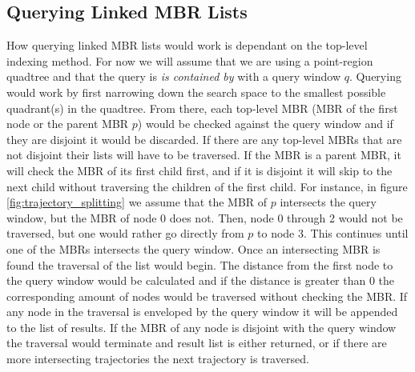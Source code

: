 \subsection{Querying Linked MBR Lists} 
How querying linked MBR lists would work is dependant on the top-level indexing method. For now we will assume that we are using a point-region quadtree and that the query is \textit{is contained by} with a query window $q$. Querying would work by first narrowing down the search space to the smallest possible quadrant(s) in the quadtree. From there, each top-level MBR (MBR of the first node or the parent MBR $p$) would be checked against the query window and if they are disjoint it would be discarded. If there are any top-level MBRs that are not disjoint their lists will have to be traversed. If the MBR is a parent MBR, it will check the MBR of its first child first, and if it is disjoint it will skip to the next child without traversing the children of the first child. For instance, in figure \ref{fig:trajectory_splitting} we assume that the MBR of $p$ intersects the query window, but the MBR of node 0 does not. Then, node 0 through 2 would not be traversed, but one would rather go directly from $p$ to node 3. This continues until one of the MBRs intersects the query window. Once an intersecting MBR is found the traversal of the list would begin. The distance from the first node to the query window would be calculated and if the distance is greater than 0 the corresponding amount of nodes would be traversed without checking the MBR. If any node in the traversal is enveloped by the query window it will be appended to the list of results. If the MBR of any node is disjoint with the query window the traversal would terminate and result list is either returned, or if there are more intersecting trajectories the next trajectory is traversed.

